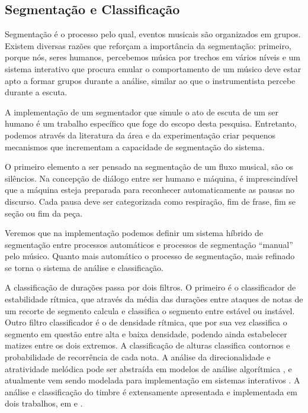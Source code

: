 \documentclass{ppgmus}
\begin{document}
\subsection{Segmentação e Classificação}


Segmentação é o processo pelo qual, eventos musicais são organizados
em grupos. Existem diversas razões que reforçam a importância da 
segmentação: primeiro, porque nós, seres humanos, percebemos música
por trechos em vários níveis e um sistema interativo que procura emular
o comportamento de um músico deve estar apto a formar grupos durante
a análise, similar ao que o instrumentista percebe durante a escuta.

A implementação de um segmentador que simule o ato de escuta de um ser 
humano é um trabalho específico que foge do escopo desta pesquisa. Entretanto,
podemos através da literatura da área e da experimentação criar pequenos
mecanismos que incrementam a capacidade de segmentação do sistema.

O primeiro elemento a ser pensado na segmentação de um fluxo musical,
são os silêncios. Na concepção de diálogo entre ser humano e máquina,
é imprescindível que a máquina esteja preparada para reconhecer automaticamente
as pausas no discurso. Cada pausa deve ser categorizada como respiração, fim de frase,
fim se seção ou fim da peça.

Veremos que na implementação podemos definir um sistema híbrido de segmentação
entre processos automáticos e processos de segmentação ``manual'' pelo músico.
Quanto mais automático o processo de segmentação, mais refinado se torna
o sistema de análise e classificação. 

A classificação de durações passa por dois filtros. O primeiro
é o classificador de estabilidade rítmica, que através da média das durações 
entre ataques de notas de um recorte de segmento calcula e classifica
o segmento entre estável ou instável.
Outro filtro classificador é o de densidade rítmica, que por sua vez classifica
o segmento em questão entre alta e baixa densidade, podendo ainda estabelecer
matizes entre os dois extremos. A classificação de alturas classifica contornos e probabilidade de recorrência
de cada nota. A análise da direcionalidade e atratividade melódica pode ser abstraída
em modelos de análise algorítmica \cite{lerdahl2001}, e atualmente vem sendo modelada para 
implementação em sistemas interativos \cite{rickgrahan}.
A análise e classificação do timbre é extensamente apresentada e implementada em dois
trabalhos, em \cite{brentcepstral} e \cite{monteiro}.
\end{document}

